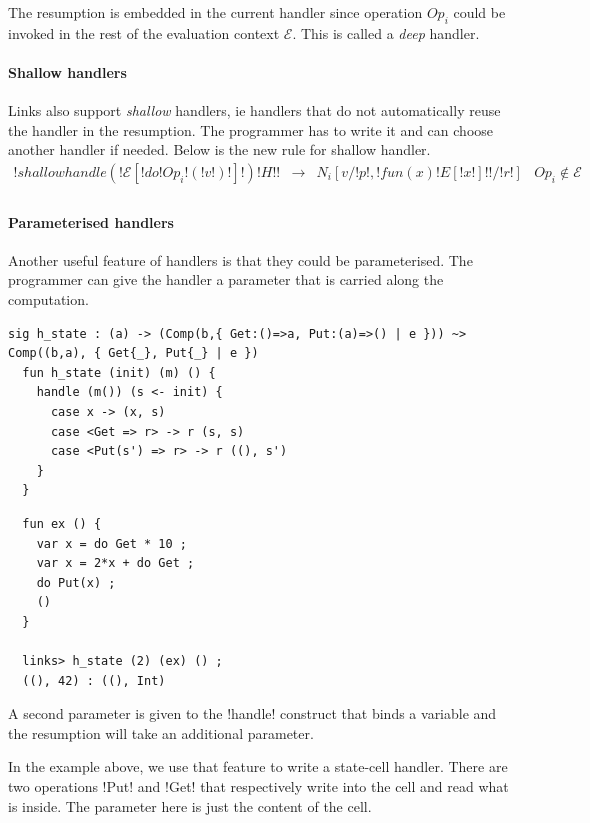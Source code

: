 \documentclass[11pt, nonacm=true, language=french, language=english]{acmart}
\begin{document}
The resumption is embedded in the current handler since operation $Op_{i}$ could be invoked in the rest of the evaluation context $\mathcal E$. This is called a \emph{deep} handler.

\paragraph{Shallow handlers}
Links also support \emph{shallow} handlers, ie handlers that do not automatically reuse the handler in the resumption. The programmer has to write it and can choose another handler if needed. Below is the new rule for shallow handler.
\[
  \begin{array}{rcll}
    !shallowhandle ( !\mathcal E[!do !Op_{i}!( !v! )!]! ) { !H! }! & \longrightarrow & N_{i}[v/!p!, !fun (x)  { ! E[!x!] ! }!/!r!] & Op_{i} \notin \mathcal E\\
  \end{array}
\]

\paragraph{Parameterised handlers}

Another useful feature of handlers is that they could be parameterised. The programmer can give the handler a parameter that is carried along the computation.

\begin{lstlisting}[caption=Example of parameterised handler for a state effect]
  sig h_state : (a) -> (Comp(b,{ Get:()=>a, Put:(a)=>() | e })) ~> Comp((b,a), { Get{_}, Put{_} | e })
  fun h_state (init) (m) () {
    handle (m()) (s <- init) {
      case x -> (x, s)
      case <Get => r> -> r (s, s)
      case <Put(s') => r> -> r ((), s')
    }
  }
\end{lstlisting}

\begin{lstlisting}
  fun ex () {
    var x = do Get * 10 ;
    var x = 2*x + do Get ;
    do Put(x) ;
    ()
  }

  links> h_state (2) (ex) () ;
  ((), 42) : ((), Int)
\end{lstlisting}

A second parameter is given to the !handle! construct that binds a variable and the resumption will take an additional parameter.

In the example above, we use that feature to write a state-cell handler. There are two operations !Put! and !Get! that respectively write into the cell and read what is inside. The parameter here is just the content of the cell.
\end{document}
